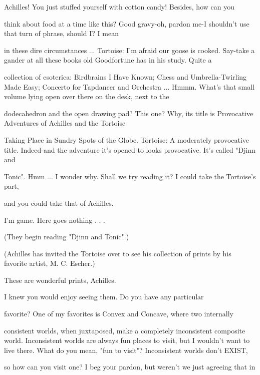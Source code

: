 \tortoise Achilles! You just stuffed yourself with cotton candy! Besides, how can you\par
think about food at a time like this? 
\achilles Good gravy-oh, pardon me-I shouldn't use that turn of phrase, should I? I mean\par
in these dire circumstances ... Tortoise: I'm afraid our goose is cooked. 
\achilles Say-take a gander at all these books old Goodfortune has in his study. Quite a\par
collection of esoterica: Birdbrains I Have Known; Chess and Umbrella-Twirling Made Easy; Concerto for Tapdancer and Orchestra ... Hmmm. 
\tortoise What's that small volume lying open over there on the desk, next to the\par
dodecahedron and the open drawing pad? 
\achilles This one? Why, its title is Provocative Adventures of Achilles and the Tortoise\par
Taking Place in Sundry Spots of the Globe. Tortoise: A moderately provocative title. 
\achilles Indeed-and the adventure it's opened to looks provocative. It's called "Djinn and\par
Tonic". 
\tortoise Hmm ... I wonder why. Shall we try reading it? I could take the Tortoise's part,\par
and you could take that of Achilles. 








\achilles I’m game. Here goes nothing . . .\par



\intro (They begin reading "Djinn and Tonic".) \endintro


(Achilles has invited the Tortoise over to see his collection of prints by his favorite artist, M. C. Escher.) 


\tortoise These are wonderful prints, Achilles.\par

\achilles I knew you would enjoy seeing them. Do you have any particular\par
favorite? 
\tortoise One of my favorites is Convex and Concave, where two internally\par
consistent worlds, when juxtaposed, make a completely inconsistent composite world. Inconsistent worlds are always fun places to visit, but I wouldn't want to live there. 
\achilles What do you mean, "fun to visit"? Inconsistent worlds don't EXIST,\par
so how can you visit one? 
\tortoise I beg your pardon, but weren't we just agreeing that in\par


